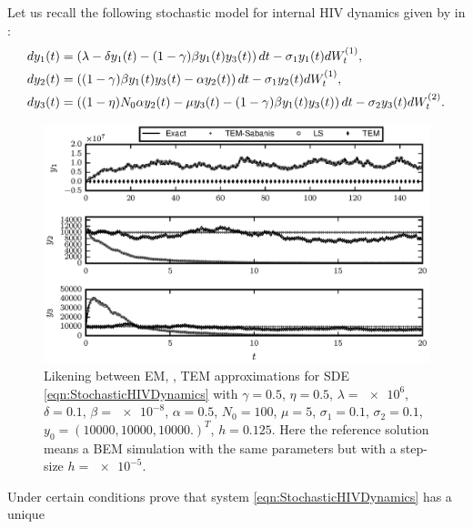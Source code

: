 \begin{example}
	Let us recall the following  stochastic model for internal 
	HIV dynamics given by  \citeauthor{Dalal2008} in \cite{Dalal2008}:
	\begin{align}\label{eqn:StochasticHIVDynamics}
		dy_1(t) &=
		\left(
			\lambda -\delta y_1(t) - (1 - \gamma) \beta y_1(t) y_3(t)
		\right)dt
		-\sigma_1 y_1(t) dW^{(1)}_t, 
		\notag \\
		dy_2(t) &= 	
		\left(
			(1- \gamma) \beta y_1(t) y_3(t) - \alpha y_2(t) 
		\right)dt
		-\sigma_1 y_2(t) dW^{(1)}_t, 
		\\
		dy_3(t) & = 
		\left(
			(1 - \eta) N_0 \alpha y_2(t) 
				-\mu y_3(t)
			-(1 - \gamma ) \beta y_1(t) y_3(t) 
		\right)dt
		- \sigma_2 y_3(t) dW^{(2)}_t.
		\notag
	\end{align}	
	\begin{figure}[h!]
		\centering
		\includegraphics{./papers/paperB/figures/InternalHIVDynamics}
		\caption{
			Likening between EM, \SM, TEM approximations for SDE \eqref{eqn:StochasticHIVDynamics} with
			$\gamma = \num{0.5}$,
			$\eta = \num{0.5}$,
			$\lambda = \num{e6}$, 
			$\delta = \num{0.1}$,
			$\beta = \num{e-8}$,
			$\alpha = \num{0.5}$,
			$N_0= \num{100}$,
			$\mu = \num{5}$,
			$\sigma_1 = \num{0.1}$,
			$\sigma_2 = \num{0.1} $,
			$y_0 = (
			\num{10000},%
			\num{10000},%
			\num{10000}.%
			)^T$,
			$h=\num{0.125}$.
			Here the reference solution means a BEM simulation
			with the same parameters but with a step-size $h=\num{e-5}$.
		}
		\label{fig:InternalHIVDynamics5e-1}
	\end{figure} 
	Under certain conditions \citeauthor{Dalal2008} prove 
	that  system \eqref{eqn:StochasticHIVDynamics} has a unique 

\end{example}

